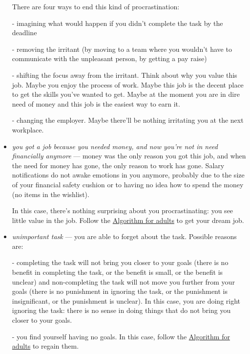 \documentclass[11pt]{article}
\theoremstyle{remark}
\theoremstyle{definition}
\begin{document}
\begin{itemize}
There are four ways to end this kind of procrastination: 


- imagining what would happen if you didn't complete the task by the deadline

- removing the irritant (by moving to a team where you wouldn't have to communicate with the unpleasant person, by getting a pay raise)

- shifting the focus away from the irritant. Think about why you value this job. Maybe you enjoy the process of work. Maybe this job is the decent place to get the skills you've wanted to get. Maybe at the moment you are in dire need of money and this job is the easiest way to earn it.

- changing the employer. Maybe there'll be nothing irritating you at the next workplace.




\item \textit{you got a job because you needed money, and now you're not in need financially anymore} --- money was the only reason you got this job, and when the need for money has gone, the only reason to work has gone. Salary notifications do not awake emotions in you anymore, probably due to the size of your financial safety cushion or to having no idea how to spend the money (no items in the wishlist).


In this case, there's nothing surprising about you procrastinating: you see little value in the job. Follow the \href{https://garkoosha.org/misc/alg_for_adults.pdf}{Algorithm for adults} to get your dream job.



\item \textit{unimportant task} --- you are able to forget about the task. Possible reasons are:

- completing the task will not bring you closer to your goals (there is no benefit in completing the task, or the benefit is small, or the benefit is unclear) and non-completing the task will not move you further from your goals (there is no punishment in ignoring the task, or the punishment is insignificant, or the punishment is unclear). In this case, you are doing right ignoring the task: there is no sense in doing things that do not bring you closer to your goals.

- you find yourself having no goals. In this case, follow the \href{https://garkoosha.org/misc/alg_for_adults.pdf}{Algorithm for adults} to regain them.




\end{itemize}
\end{document}
